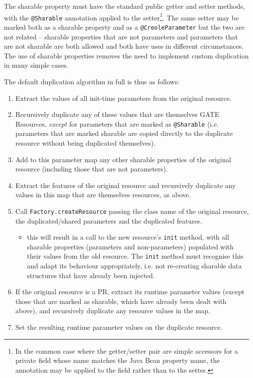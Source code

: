 The sharable property must have the standard public getter and setter methods,
with the \verb|@Sharable| annotation applied to the setter\footnote{In the
common case where the getter/setter pair are simple accessors for a private
field whose name matches the Java Bean property name, the annotation may be
applied to the field rather than to the setter.}.  The same setter may be
marked both as a sharable property and as a \verb|@CreoleParameter| but
the two are not related -- sharable properties that are not parameters and
parameters that are not sharable are both allowed and both have uses in
different circumstances.  The use of sharable properties removes the need to
implement custom duplication in many simple cases.

The default duplication algorithm in full is thus as follows:
\begin{enumerate}
\item Extract the values of all init-time parameters from the original
  resource.
\item Recursively duplicate any of these values that are themselves GATE
  Resources, {\em except} for parameters that are marked as \verb|@Sharable|
  (i.e. parameters that are marked sharable are copied directly to the
  duplicate resource without being duplicated themselves).
\item Add to this parameter map any other sharable properties of the original
  resource (including those that are not parameters).
\item Extract the features of the original resource and recursively duplicate
  any values in this map that are themselves resources, as above.
\item Call \verb|Factory.createResource| passing the class name of the original
  resource, the duplicated/shared parameters and the duplicated features.
  \begin{itemize}
  \item this will result in a call to the new resource's \verb|init| method,
    with all sharable properties (parameters and non-parameters) populated with
    their values from the old resource.  The \verb|init| method must recognise
    this and adapt its behaviour appropriately, i.e. not re-creating sharable
    data structures that have already been injected.
  \end{itemize}
\item If the original resource is a PR, extract its runtime parameter values
  (except those that are marked as sharable, which have already been dealt with
  above), and recursively duplicate any resource values in the map.
\item Set the resulting runtime parameter values on the duplicate resource.
\end{enumerate}

